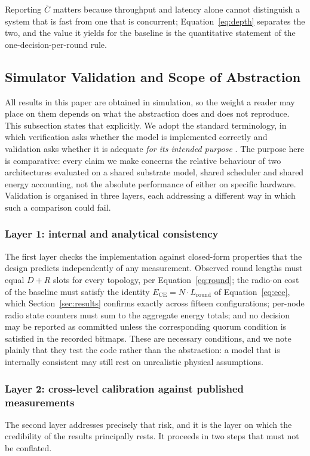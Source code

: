 \documentclass[journal]{IEEEtran}
\newcommand{\Nnodes}{N}                   %
\newcommand{\Diam}{D}                     %
\newcommand{\Nretx}{R}                    %
\newcommand{\Lround}{L_{\mathrm{round}}}  %
\newcommand{\Cdepth}{\bar{C}}             %
\newcommand{\Ece}{E_{\mathrm{CE}}}        %
\begin{document}
Reporting $\Cdepth$ matters because throughput and latency alone cannot
distinguish a system that is fast from one that is concurrent;
Equation~\eqref{eq:depth} separates the two, and the value it yields for
the baseline is the quantitative statement of the one-decision-per-round
rule.

\subsection{Simulator Validation and Scope of Abstraction}
\label{sec:method-validation}
All results in this paper are obtained in simulation, so the weight a
reader may place on them depends on what the abstraction does and does not
reproduce. This subsection states that explicitly. We adopt the standard
terminology, in which verification asks whether the model is implemented
correctly and validation asks whether it is adequate \emph{for its
intended purpose} \cite{sargent13validation}. The purpose here is
comparative: every claim we make concerns the relative behaviour of two
architectures evaluated on a shared substrate model, shared scheduler and
shared energy accounting, not the absolute performance of either on
specific hardware. Validation is organised in three layers, each
addressing a different way in which such a comparison could fail.

\subsubsection{Layer 1: internal and analytical consistency}
The first layer checks the implementation against closed-form properties
that the design predicts independently of any measurement. Observed round
lengths must equal $\Diam + \Nretx$ slots for every topology, per
Equation~\eqref{eq:round}; the radio-on cost of the baseline must satisfy
the identity $\Ece = \Nnodes \cdot \Lround$ of
Equation~\eqref{eq:ece}, which Section~\ref{sec:results} confirms exactly
across fifteen configurations; per-node radio state
counters must sum to the aggregate energy totals; and no decision may be
reported as committed unless the corresponding quorum condition is
satisfied in the recorded bitmaps. These are necessary conditions, and we
note plainly that they test the code rather than the abstraction: a model
that is internally consistent may still rest on unrealistic physical
assumptions.

\subsubsection{Layer 2: cross-level calibration against published measurements}
The second layer addresses precisely that risk, and it is the layer on
which the credibility of the results principally rests. It proceeds in two
steps that must not be conflated.
\end{document}
